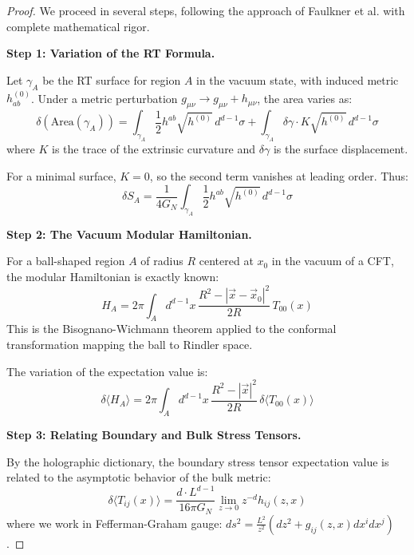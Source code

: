 \documentclass[12pt,a4paper]{article}
\begin{document}
\begin{proof}
We proceed in several steps, following the approach of Faulkner et al. with complete mathematical rigor.

\textbf{Step 1: Variation of the RT Formula.}

Let $\gamma_A$ be the RT surface for region $A$ in the vacuum state, with induced metric $h_{ab}^{(0)}$. Under a metric perturbation $g_{\mu\nu} \to g_{\mu\nu} + h_{\mu\nu}$, the area varies as:
\begin{equation}
\delta(\text{Area}(\gamma_A)) = \int_{\gamma_A} \frac{1}{2}h^{ab} \sqrt{h^{(0)}} \, d^{d-1}\sigma + \int_{\gamma_A} \delta\gamma \cdot K \sqrt{h^{(0)}} \, d^{d-1}\sigma
\end{equation}
where $K$ is the trace of the extrinsic curvature and $\delta\gamma$ is the surface displacement.

For a minimal surface, $K = 0$, so the second term vanishes at leading order. Thus:
\begin{equation}
\delta S_A = \frac{1}{4G_N}\int_{\gamma_A} \frac{1}{2}h^{ab} \sqrt{h^{(0)}} \, d^{d-1}\sigma
\end{equation}

\textbf{Step 2: The Vacuum Modular Hamiltonian.}

For a ball-shaped region $A$ of radius $R$ centered at $x_0$ in the vacuum of a CFT, the modular Hamiltonian is exactly known:
\begin{equation}
H_A = 2\pi \int_A d^{d-1}x \, \frac{R^2 - |\vec{x} - \vec{x}_0|^2}{2R} \, T_{00}(x)
\end{equation}
This is the Bisognano-Wichmann theorem applied to the conformal transformation mapping the ball to Rindler space.

The variation of the expectation value is:
\begin{equation}
\delta \langle H_A \rangle = 2\pi \int_A d^{d-1}x \, \frac{R^2 - |\vec{x}|^2}{2R} \, \delta\langle T_{00}(x) \rangle
\end{equation}

\textbf{Step 3: Relating Boundary and Bulk Stress Tensors.}

By the holographic dictionary, the boundary stress tensor expectation value is related to the asymptotic behavior of the bulk metric:
\begin{equation}
\delta\langle T_{ij}(x) \rangle = \frac{d \cdot L^{d-1}}{16\pi G_N} \lim_{z \to 0} z^{-d} h_{ij}(z, x)
\end{equation}
where we work in Fefferman-Graham gauge: $ds^2 = \frac{L^2}{z^2}(dz^2 + g_{ij}(z,x)dx^i dx^j)$.


\end{proof}
\end{document}
